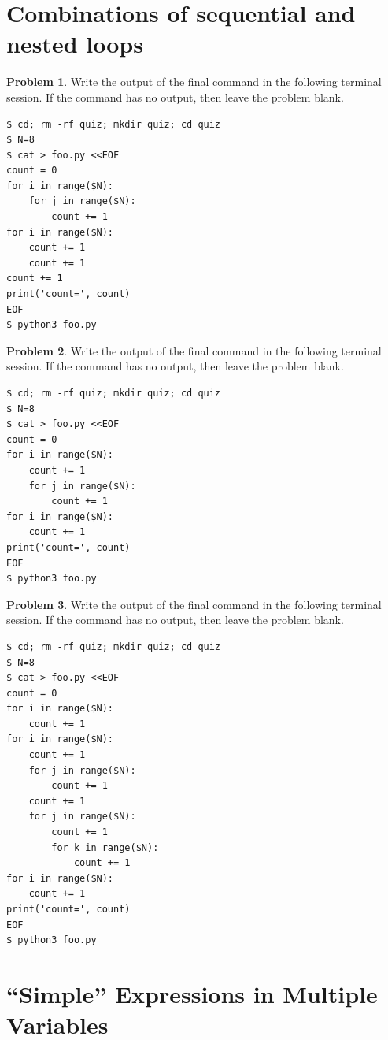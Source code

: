 \documentclass[10pt]{article}
\theoremstyle{definition}
\newtheorem{problem}{Problem}
\begin{document}
\filbreak
\section{Combinations of sequential and nested loops}

\begin{problem}
    Write the output of the final command in the following terminal session.
    If the command has no output, then leave the problem blank.
\end{problem}
\begin{lstlisting}
$ cd; rm -rf quiz; mkdir quiz; cd quiz
$ N=8
$ cat > foo.py <<EOF
count = 0
for i in range($N):
    for j in range($N):
        count += 1
for i in range($N):
    count += 1
    count += 1
count += 1
print('count=', count)
EOF
$ python3 foo.py
\end{lstlisting}
\vspace{0.4in}

\filbreak
\begin{problem}
    Write the output of the final command in the following terminal session.
    If the command has no output, then leave the problem blank.
\end{problem}
\begin{lstlisting}
$ cd; rm -rf quiz; mkdir quiz; cd quiz
$ N=8
$ cat > foo.py <<EOF
count = 0
for i in range($N):
    count += 1
    for j in range($N):
        count += 1
for i in range($N):
    count += 1
print('count=', count)
EOF
$ python3 foo.py
\end{lstlisting}
\vspace{0.4in}

\filbreak
\begin{problem}
    Write the output of the final command in the following terminal session.
    If the command has no output, then leave the problem blank.
\end{problem}
\begin{lstlisting}
$ cd; rm -rf quiz; mkdir quiz; cd quiz
$ N=8
$ cat > foo.py <<EOF
count = 0
for i in range($N):
    count += 1
for i in range($N):
    count += 1
    for j in range($N):
        count += 1
    count += 1
    for j in range($N):
        count += 1
        for k in range($N):
            count += 1
for i in range($N):
    count += 1
print('count=', count)
EOF
$ python3 foo.py
\end{lstlisting}
\vspace{0.4in}

\filbreak
\section{``Simple'' Expressions in Multiple Variables}
\end{document}
